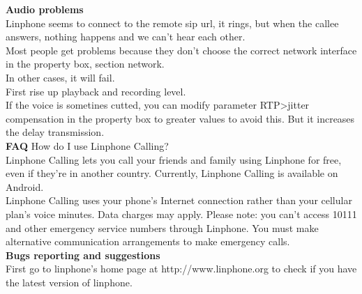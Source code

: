 \documentclass[a4paper]{article}
\begin{document}
\textbf{Audio problems} \\
Linphone seems to connect to the remote sip url, it rings, but when the callee answers,
nothing happens and we can't hear each other. \\

Most people get problems because they don't choose the correct network interface
in the property box, section network. \\

In other cases, it will fail. \\
First rise up playback and recording level. \\
If the voice is sometines cutted, you can modify parameter RTP\->jitter \\
compensation in the property box to greater values to avoid this. But it increases the
delay transmission. \\

\textbf{FAQ}
How do I use Linphone Calling? \\
Linphone Calling lets you call your friends and family using Linphone for free, even if they're in another country. Currently, Linphone Calling is available on Android. \\
Linphone Calling uses your phone's Internet connection rather than your cellular plan's voice minutes. Data charges may apply.
Please note: you can't access 10111 and other emergency service numbers through Linphone. You must make alternative communication arrangements to make emergency calls. \\

\textbf{Bugs reporting and suggestions} \\
First go to linphone's home page at http://www.linphone.org to check if you have the
latest version of linphone. \\
\end{document}
